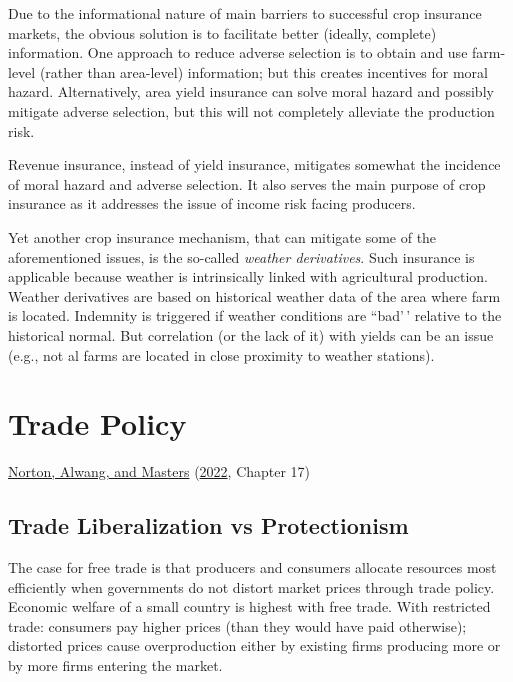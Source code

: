 \documentclass[
  oneside]{book}
\begin{document}
Due to the informational nature of main barriers to successful crop insurance markets, the obvious solution is to facilitate better (ideally, complete) information. One approach to reduce adverse selection is to obtain and use farm-level (rather than area-level) information; but this creates incentives for moral hazard. Alternatively, area yield insurance can solve moral hazard and possibly mitigate adverse selection, but this will not completely alleviate the production risk.

Revenue insurance, instead of yield insurance, mitigates somewhat the incidence of moral hazard and adverse selection. It also serves the main purpose of crop insurance as it addresses the issue of income risk facing producers.

Yet another crop insurance mechanism, that can mitigate some of the aforementioned issues, is the so-called \emph{weather derivatives}. Such insurance is applicable because weather is intrinsically linked with agricultural production. Weather derivatives are based on historical weather data of the area where farm is located. Indemnity is triggered if weather conditions are ``bad'\,' relative to the historical normal. But correlation (or the lack of it) with yields can be an issue (e.g., not al farms are located in close proximity to weather stations).

\hypertarget{trade-policy}{%
\chapter{Trade Policy}\label{trade-policy}}

\protect\hyperlink{ref-norton2022}{Norton, Alwang, and Masters} (\protect\hyperlink{ref-norton2022}{2022}, Chapter 17)

\hypertarget{trade-liberalization-vs-protectionism}{%
\section{Trade Liberalization vs Protectionism}\label{trade-liberalization-vs-protectionism}}

The case for free trade is that producers and consumers allocate resources most efficiently when governments do not distort market prices through trade policy. Economic welfare of a small country is highest with free trade. With restricted trade: consumers pay higher prices (than they would have paid otherwise); distorted prices cause overproduction either by existing firms producing more or by more firms entering the market.
\end{document}
